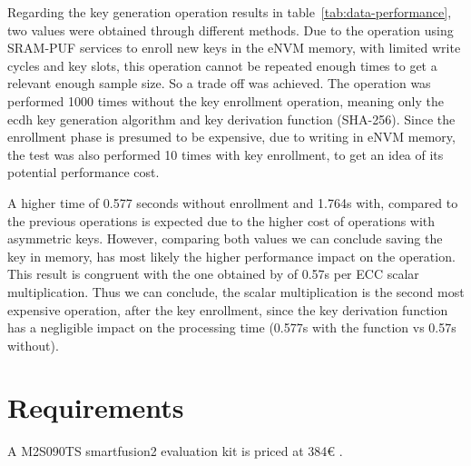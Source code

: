 

Regarding the key generation operation results in table~\ref{tab:data-performance}, two values were obtained through different methods. Due to the operation using SRAM-PUF services to enroll new keys in the eNVM memory, with limited write cycles and key slots, this operation cannot be repeated enough times to get a relevant enough sample size.
So a trade off was achieved. The operation was performed 1000 times without the key enrollment operation, meaning only the ecdh key generation algorithm and key derivation function (SHA-256).
Since the enrollment phase is presumed to be expensive, due to writing in eNVM memory, the test was also performed 10 times with key enrollment, to get an idea of its potential performance cost.

A higher time of 0.577 seconds without enrollment and 1.764s with, compared to the previous operations is expected due to the higher cost of operations with asymmetric keys.
However, comparing both values we can conclude saving the key in memory, has most likely the higher performance impact on the operation.
This result is congruent with the one obtained by \cite{parrinha2017flexible} of 0.57s per ECC scalar multiplication.
Thus we can conclude, the scalar multiplication is the second most expensive operation, after the key enrollment, since the key derivation function has a negligible impact on the processing time (0.577s with the function vs 0.57s without).

\section{Requirements}\label{chap:evaluation:requirements}

A M2S090TS smartfusion2 evaluation kit is priced at 384€ \cite{smartfusionPrice}.


